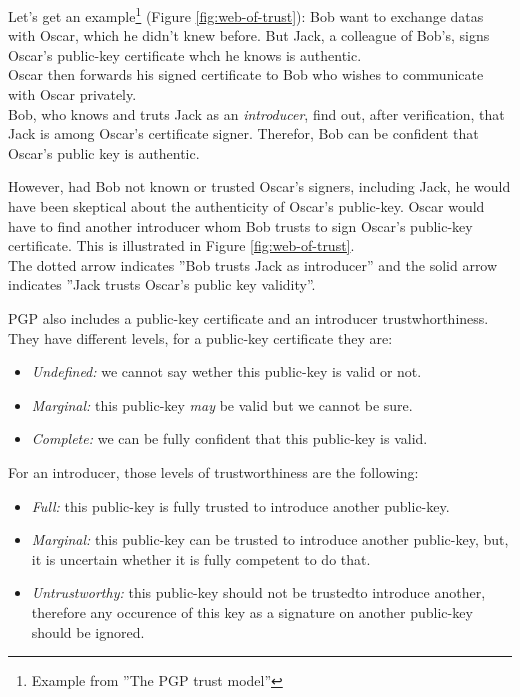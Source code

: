 \documentclass[journal, a4paper]{IEEEtran}
\begin{document}
Let's get an example\footnote{Example from ''The PGP trust model''\cite{caronni2000}} (Figure \ref{fig:web-of-trust}): Bob want to exchange datas with Oscar, which he didn't knew before. But Jack, a colleague of Bob's, signs Oscar's public-key certificate whch he knows is authentic.\\
Oscar then forwards his signed certificate to Bob who wishes to communicate with Oscar privately.\\
Bob, who knows and truts Jack as an \textit{introducer}, find out, after verification, that Jack is among Oscar's certificate signer. Therefor, Bob can be confident that Oscar's public key is authentic.

However, had Bob not known or trusted Oscar's signers, including Jack, he would have been skeptical about the authenticity of Oscar's public-key. Oscar would have to find another introducer whom Bob trusts to sign Oscar's public-key certificate. This is illustrated in Figure \ref{fig:web-of-trust}.\\
The dotted arrow indicates ''Bob trusts Jack as introducer'' and the solid arrow indicates ''Jack trusts Oscar’s public key validity''. 


PGP also includes a public-key certificate and an introducer trustwhorthiness. They have different levels, for a public-key certificate they are:
\begin{itemize}
	\item \textit{Undefined:} we cannot say wether this public-key is valid or not.
	\item \textit{Marginal:} this public-key \textit{may} be valid but we cannot be sure.
	\item \textit{Complete:} we can be fully confident that this public-key is valid.
\end{itemize}
For an introducer, those levels of trustworthiness are the following:
\begin{itemize}
	\item \textit{Full:} this public-key is fully trusted to introduce another public-key.
	\item \textit{Marginal:} this public-key can be trusted to introduce another public-key, but, it is uncertain whether it is fully competent to do that.
	\item \textit{Untrustworthy:} this public-key should not be trustedto introduce another, therefore any occurence of this key as a signature on another public-key should be ignored.
\end{itemize}
\end{document}
